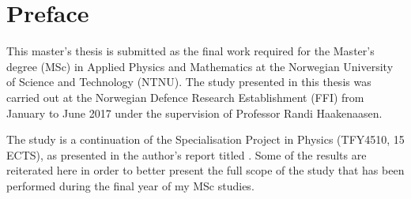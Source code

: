 \chapter*{Preface}%
%
This master's thesis is submitted as the final work required for the Master's degree (MSc) in Applied Physics and Mathematics at the Norwegian University of Science and Technology (NTNU). The study presented in this thesis was carried out at the Norwegian Defence Research Establishment (FFI) from January to June 2017 under the supervision of Professor Randi Haakenaasen. 

The study is a continuation of the Specialisation Project in Physics (TFY4510, 15 ECTS), as presented in the author's report titled  \citep{lauten2017characterisation}. Some of the results are reiterated here in order to better present the full scope of the study that has been performed during the final year of my MSc studies. %


